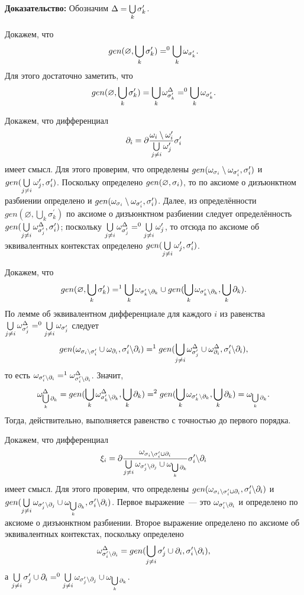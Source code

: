 \textbf{Доказательство:}
Обозначим $\Delta = \bigcup\limits_k {\sigma^\prime_k}$.

Докажем, что $$gen(\varnothing, \bigcup\limits_k {\sigma^\prime_k}) =^0 \bigcup\limits_k \omega_{{\sigma^\prime_k}}.$$ 
Для этого достаточно заметить, что $$gen(\varnothing, \bigcup\limits_k {\sigma^\prime_k}) = \bigcup\limits_k \omega^\Delta_{{\sigma^\prime_k}} =^0 \bigcup\limits_k \omega_{{\sigma^\prime_k}}.$$

Докажем, что дифференциал $$\partial_i = \partial\dfrac{\omega_i \setminus \omega_i^\prime}{\bigcup\limits_{j \neq i}\omega^\prime_j} \sigma_i^\prime$$ имеет смысл. Для этого проверим, что определены $gen(\omega_{{\sigma_i}} \setminus \omega_{{\sigma^\prime_i}}, {\sigma^\prime_i})$ и $gen(\bigcup\limits_{j \neq i}\omega^\prime_j, {\sigma^\prime_i})$. Поскольку определено $gen(\varnothing, {\sigma_i})$, то по аксиоме о дизъюнктном разбиении определено и $gen(\omega_{{\sigma_i}} \setminus \omega_{{\sigma^\prime_i}}, {\sigma^\prime_i})$. Далее, из определённости $gen(\varnothing, \bigcup\limits_k \sigma^\prime_k)$ по аксиоме о дизъюнктном разбиении следует определённость $gen(\bigcup\limits_{j \neq i}\omega^\Delta_{\sigma^\prime_j}, {\sigma^\prime_i})$; поскольку $\bigcup\limits_{j \neq i}\omega^\Delta_{\sigma^\prime_j} =^0 \bigcup\limits_{j \neq i}\omega^\prime_j$, то отсюда по аксиоме об эквивалентных контекстах определено $gen(\bigcup\limits_{j \neq i}\omega^\prime_j, {\sigma^\prime_i})$.

Докажем, что $$gen(\varnothing, \bigcup\limits_k {\sigma^\prime_k}) =^1 \bigcup\limits_k \omega_{{\sigma^\prime_k}{\setminus}{\partial_k}} \cup gen(\bigcup\limits_k \omega_{{\sigma^\prime_k}{\setminus}{\partial_k}}, \bigcup\limits_k {\partial_k}).$$ 
По лемме об эквивалентном дифференциале для каждого $i$ из равенства $\bigcup\limits_{j \neq i}\omega^\Delta_{{\sigma^\prime_j}} =^0 \bigcup\limits_{j \neq i} \omega_{{\sigma^\prime_j}}$ следует $$gen(\omega_{{\sigma_i}{\setminus}{\sigma^\prime_i}} \cup \omega_{\partial_i}, {\sigma^\prime_i}{\setminus}{\partial_i}) =^1 gen(\bigcup\limits_{j \neq i}\omega^\Delta_{{\sigma^\prime_j}} \cup \omega^\Delta_{\partial_i}, {\sigma^\prime_i}{\setminus}{\partial_i}),$$ 
то есть $\omega_{{\sigma^\prime_i}{\setminus}{\partial_i}} =^1 \omega^\Delta_{{\sigma^\prime_i}{\setminus}{\partial_i}}$. Значит, $$\omega^\Delta_{\bigcup\limits_k {\partial_k}} = gen(\bigcup\limits_k \omega^\Delta_{{\sigma^\prime_k}{\setminus}{\partial_k}}, \bigcup\limits_k {\partial_k}) =^2 gen(\bigcup\limits_k \omega_{{\sigma^\prime_k}{\setminus}{\partial_k}}, \bigcup\limits_k {\partial_k}) = \omega_{\bigcup\limits_k {\partial_k}}.$$ 
Тогда, действительно, выполняется равенство с точностью до первого порядка.

Докажем, что дифференциал $$\xi_i = \partial\dfrac{\omega_{{\sigma_i}{\setminus}{\sigma^\prime_i} \cup {\partial_i}}}{\bigcup\limits_{j \neq i} \omega_{{\sigma^\prime_j}{\setminus}{\partial_j}} \cup \omega_{\bigcup\limits_k \partial_k}} {\sigma^\prime_i}{\setminus}{\partial_i}$$ имеет смысл. Для этого проверим, что определены $gen(\omega_{{\sigma_i}{\setminus}{\sigma^\prime_i} \cup {\partial_i}}, {\sigma^\prime_i}{\setminus}{\partial_i})$ и $gen(\bigcup\limits_{j \neq i} \omega_{{\sigma^\prime_j}{\setminus}{\partial_j}} \cup \omega_{\bigcup\limits_k \partial_k}, {\sigma^\prime_i}{\setminus}{\partial_i})$. Первое выражение~--- это $\omega_{{\sigma^\prime_i}{\setminus}{\partial_i}}$ и определено по аксиоме о дизъюнктном разбиении. Второе выражение определено по аксиоме об эквивалентных контекстах, поскольку определено $$\omega^\Delta_{{\sigma^\prime_i}{\setminus}{\partial_i}} = gen(\bigcup\limits_{j \neq i} {\sigma^\prime_j} \cup {\partial_i}, {\sigma^\prime_i}{\setminus}{\partial_i}),$$ 
а $\bigcup\limits_{j \neq i} {\sigma^\prime_j} \cup {\partial_i} =^0 \bigcup\limits_{j \neq i} \omega_{{\sigma^\prime_j}{\setminus}{\partial_j}} \cup \omega_{\bigcup\limits_k \partial_k}$.

